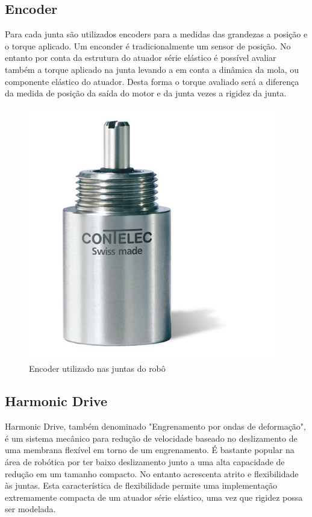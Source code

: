 
\subsection{Encoder}

Para cada junta são utilizados encoders para a medidas das grandezas a posição e o torque aplicado. Um enconder é tradicionalmente um sensor de posição. No entanto por conta da estrutura do atuador série elástico é possível avaliar também a torque aplicado na junta levando a em conta a dinâmica da mola, ou componente elástico do atuador. Desta forma o torque avaliado será a diferença da medida de posição da saída do motor e da junta vezes a rigidez da junta. 

\begin{figure}[H]
    \centering
    \includegraphics[width = 0.4\linewidth]{figs/vertX-encoder}
        \caption{Encoder utilizado nas juntas do robô}
    \label{fig:encoder}
\end{figure}

\subsection{Harmonic Drive}

Harmonic Drive, também denominado "Engrenamento por ondas de deformação", é um sistema mecânico para redução de velocidade baseado no deslizamento de uma membrana flexível em torno de um engrenamento. É bastante popular na área de robótica por ter baixo deslizamento junto a uma alta capacidade de redução em um tamanho compacto. No entanto acrescenta atrito e flexibilidade às juntas. Esta característica de flexibilidade permite uma implementação extremamente compacta de um atuador série elástico, uma vez que rigidez possa ser modelada. 

